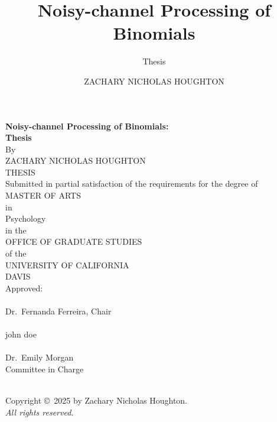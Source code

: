 \documentclass[
  12pt,
]{scrartcl}
\title{Noisy-channel Processing of Binomials}
\subtitle{Thesis}
\author{ZACHARY NICHOLAS HOUGHTON}
\date{}
\begin{document}
\cleardoublepage
\thispagestyle{plain}
\begin{center}
   \null\vfill
   \textbf{%
      Noisy-channel Processing of Binomials:\\
	  Thesis
   }%
   \\
   \bigskip
   By \\
   \bigskip
   {ZACHARY NICHOLAS HOUGHTON}
\\   
   THESIS \\
   \bigskip
   Submitted in partial satisfaction of the requirements for the
   degree of \\
   \bigskip
   MASTER OF ARTS \\
   \bigskip
   in \\
   \bigskip
   {Psychology} \\ 
      \bigskip
   in the \\
   \bigskip
   OFFICE OF GRADUATE STUDIES \\
   \bigskip        
   of the \\
   \bigskip
   UNIVERSITY OF CALIFORNIA \\
   \bigskip
   DAVIS \\
   \bigskip
   Approved: \\
   \bigskip
   \bigskip
   \makebox[3in]{\hrulefill} \\
   Dr.~Fernanda Ferreira, Chair \\
   \bigskip
   \bigskip
   \makebox[3in]{\hrulefill} \\
   john doe \\
   \bigskip
   \bigskip
   \makebox[3in]{\hrulefill} \\
   Dr.~Emily Morgan \\
   \bigskip
   Committee in Charge \\
    \\
   \vfill
\end{center}


\newpage
{}
\setcounter{savedpage}{\value{page}}

\thispagestyle{empty}
\begin{titlepage}
\begin{center}
  Copyright \copyright\ 2025 by Zachary Nicholas Houghton. \\
  \textit{All rights reserved.}
\end{center}
\end{titlepage}
\end{document}
